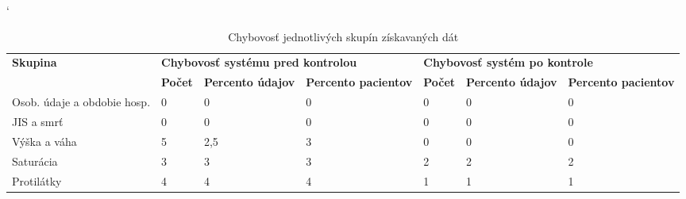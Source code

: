 \begin{table}[h!]
	\catcode`
	\caption[Chybovosť jednotlivých skupín]{Chybovosť jednotlivých skupín získavaných dát}
	\label{tab:chyby}
	
	
	\begin{tabular}{|p{2.3cm}|llp{1.9cm}|llp{1.9cm}|}
		\hline
		\multirow{2}{*}{\footnotesize{\textbf{Skupina}}} & 
		\multicolumn{3}{p{6.05cm}|}{\footnotesize{\textbf{Chybovosť systému pred kontrolou}}} & 
		\multicolumn{3}{p{5.3cm}|}{\footnotesize{\textbf{Chybovosť systém po kontrole}}}                                                      
		\\ \cline{2-7} 
		& \multicolumn{1}{p{1.4cm}|}{\footnotesize{\textbf{Počet}}} & 
		\multicolumn{1}{p{1.8cm}|}{\footnotesize{\textbf{Percento údajov}}} & 
		\footnotesize{\textbf{Percento pacientov}} & 
		\multicolumn{1}{p{1.4cm}|}{\footnotesize{\textbf{Počet}}} & 
		\multicolumn{1}{p{1.8cm}|}{\footnotesize{\textbf{Percento údajov}}} & 
		\footnotesize{\textbf{Percento pacientov}} 
		\\ \hline
		
		\footnotesize{Osob. údaje a obdobie hosp.}   &
		\multicolumn{1}{l|}{0} &
		\multicolumn{1}{l|}{0} &
		0  & 
		\multicolumn{1}{l|}{0} &
		\multicolumn{1}{l|}{0} & 
		0                           
		\\ \hline
		
		\footnotesize{JIS a smrť}   &
		\multicolumn{1}{l|}{0} &
		\multicolumn{1}{l|}{0} &
		0  & 
		\multicolumn{1}{l|}{0} &
		\multicolumn{1}{l|}{0} & 
		0                           
		\\ \hline
		
		\footnotesize{Výška a váha}   &
		\multicolumn{1}{l|}{5} &
		\multicolumn{1}{l|}{2,5} &
		3  & 
		\multicolumn{1}{l|}{0} &
		\multicolumn{1}{l|}{0} & 
		0                           
		\\ \hline
		
		\footnotesize{Saturácia}   &
		\multicolumn{1}{l|}{3} &
		\multicolumn{1}{l|}{3} &
		3  & 
		\multicolumn{1}{l|}{2} &
		\multicolumn{1}{l|}{2} & 
		2                           
		\\ \hline
		
		\footnotesize{Protilátky}   &
		\multicolumn{1}{l|}{4} &
		\multicolumn{1}{l|}{4} &
		4  & 
		\multicolumn{1}{l|}{1} &
		\multicolumn{1}{l|}{1} & 
		1                           
		\\ \hline
		

\end{tabular}
\end{table}
